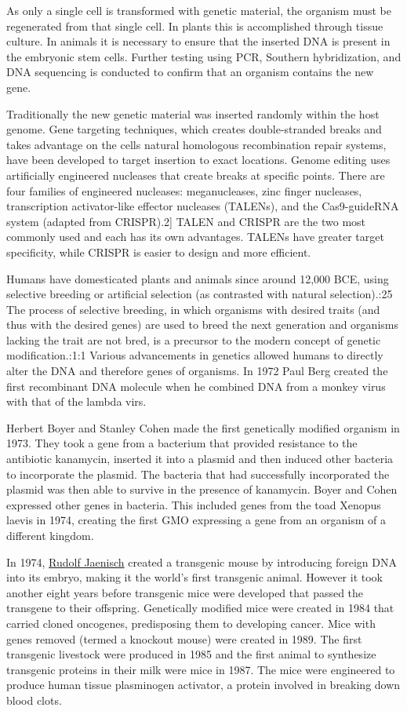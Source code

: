 As only a single cell is transformed with genetic material, the organism must be regenerated from that single cell. In plants this is accomplished through tissue culture. In animals it is necessary to ensure that the inserted DNA is present in the embryonic stem cells. Further testing using PCR, Southern hybridization, and DNA sequencing is conducted to confirm that an organism contains the new gene.

Traditionally the new genetic material was inserted randomly within the host genome. Gene targeting techniques, which creates double-stranded breaks and takes advantage on the cells natural homologous recombination repair systems, have been developed to target insertion to exact locations. Genome editing uses artificially engineered nucleases that create breaks at specific points. There are four families of engineered nucleases: meganucleases, zinc finger nucleases, transcription activator-like effector nucleases (TALENs), and the Cas9-guideRNA system (adapted from CRISPR).2{]} TALEN and CRISPR are the two most commonly used and each has its own advantages. TALENs have greater target specificity, while CRISPR is easier to design and more efficient.

Humans have domesticated plants and animals since around 12,000 BCE, using selective breeding or artificial selection (as contrasted with natural selection).:25 The process of selective breeding, in which organisms with desired traits (and thus with the desired genes) are used to breed the next generation and organisms lacking the trait are not bred, is a precursor to the modern concept of genetic modification.:1:1 Various advancements in genetics allowed humans to directly alter the DNA and therefore genes of organisms. In 1972 Paul Berg created the first recombinant DNA molecule when he combined DNA from a monkey virus with that of the lambda virs.

Herbert Boyer and Stanley Cohen made the first genetically modified organism in 1973. They took a gene from a bacterium that provided resistance to the antibiotic kanamycin, inserted it into a plasmid and then induced other bacteria to incorporate the plasmid. The bacteria that had successfully incorporated the plasmid was then able to survive in the presence of kanamycin. Boyer and Cohen expressed other genes in bacteria. This included genes from the toad Xenopus laevis in 1974, creating the first GMO expressing a gene from an organism of a different kingdom.

In 1974, \href{https://en.wikipedia.org/wiki/Rudolf_Jaenisch}{Rudolf Jaenisch} created a transgenic mouse by introducing foreign DNA into its embryo, making it the world's first transgenic animal. However it took another eight years before transgenic mice were developed that passed the transgene to their offspring. Genetically modified mice were created in 1984 that carried cloned oncogenes, predisposing them to developing cancer. Mice with genes removed (termed a knockout mouse) were created in 1989. The first transgenic livestock were produced in 1985 and the first animal to synthesize transgenic proteins in their milk were mice in 1987. The mice were engineered to produce human tissue plasminogen activator, a protein involved in breaking down blood clots.

